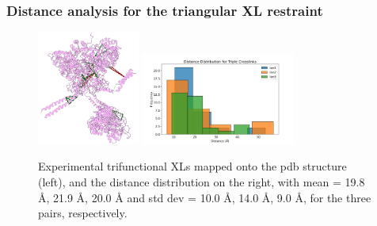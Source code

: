 \documentclass[a4paper,8pt]{beamer}
\begin{document}
\begin{frame}
  \frametitle{Distance analysis for the triangular XL restraint}
  \begin{figure}
    \centering
    \includegraphics[width=0.3\textwidth]{test-figures/exp-triples.png}
    \includegraphics[width=0.45\textwidth]{test-figures/tri-distribution.png}
    \caption{Experimental trifunctional XLs mapped onto the pdb structure (left), and the distance distribution on the right, with
    mean = 19.8 {\AA}, 21.9 {\AA}, 20.0 {\AA} and std dev = 10.0 {\AA}, 14.0 {\AA}, 9.0 {\AA}, for the three pairs, respectively.}
    \end{figure}
\end{frame}
%
\end{document}
